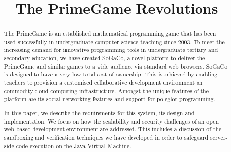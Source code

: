 \documentclass[conference]{IEEEtran}
\begin{document}
\title{The PrimeGame Revolutions 
}

\author{
	\and
	\and
	\and 
}

\maketitle

\begin{abstract}
	
The PrimeGame is an established mathematical programming game that has been used successfully in undergraduate computer science teaching since 2003. To meet the increasing demand for innovative programming tools in undergraduate tertiary and secondary education, we have created SoGaCo, a novel platform to deliver the PrimeGame and similar games to a wide audience via standard web browsers. SoGaCo is designed to have a very low total cost of ownership. This is achieved by enabling teachers to provision a customised collaborative development environment on commodity cloud computing infrastructure. Amongst the unique features of the platform are its social networking features and support for polyglot programming. 

In this paper, we describe the requirements for this system, its design and implementation. We focus on how the scalability and security challenges of an open web-based development environment are addressed. This includes a discussion of the sandboxing and verification techniques we have developed in order to safeguard server-side code execution on the Java Virtual Machine.  

\end{abstract}
\end{document}
